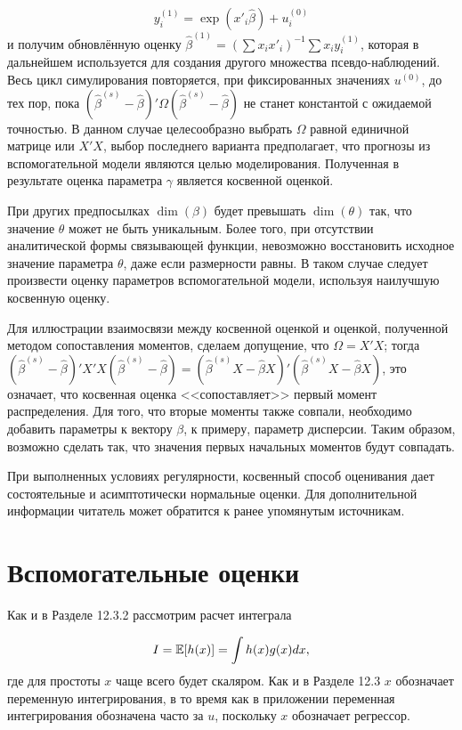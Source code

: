 \[
y^{(1)}_i=\exp(x'_{i}\hat{\beta})+u^{(0)}_i
\]
и получим обновлённую оценку $\hat{\beta}^{(1)}=(\sum{x_{i}x'_{i}})^{-1}\sum{x_{i}y^{(1)}_i}$, которая в дальнейшем используется для создания другого множества псевдо-наблюдений. Весь цикл симулирования повторяется, при фиксированных значениях $u^{(0)}$, до тех пор, пока $(\hat{\beta}^{(s)}-\hat{\beta})'\Omega(\hat{\beta}^{(s)}-\hat{\beta})$ не станет константой с ожидаемой точностью. В данном случае целесообразно выбрать $\Omega$ равной единичной матрице или $X'X$, выбор последнего варианта предполагает, что прогнозы из вспомогательной модели являются целью моделирования. Полученная в результате оценка параметра $\gamma$ является косвенной оценкой.

При других предпосылках $\dim{(\beta)}$ будет превышать $\dim{(\theta)}$ так, что  значение $\theta$ может не быть уникальным. Более того, при отсутствии аналитической формы связывающей функции, невозможно восстановить исходное значение параметра $\theta$, даже если размерности равны. В таком случае следует произвести оценку параметров вспомогательной модели, используя наилучшую косвенную оценку.

Для иллюстрации взаимосвязи между косвенной оценкой и оценкой, полученной методом сопоставления моментов, сделаем допущение, что $\Omega=X'X$; тогда $(\hat{\beta}^{(s)}-\hat{\beta})'X'X(\hat{\beta}^{(s)}-\hat{\beta})=(\hat{\beta}^{(s)}X-\hat{\beta}X)'(\hat{\beta}^{(s)}X-\hat{\beta}X)$, это означает, что косвенная оценка <<сопоставляет>> первый момент распределения. Для того, что вторые моменты также совпали, необходимо добавить параметры к вектору $\beta$, к примеру, параметр дисперсии. Таким образом, возможно сделать так, что значения первых начальных моментов будут совпадать.

При выполненных условиях регулярности, косвенный способ оценивания дает состоятельные и асимптотически нормальные оценки. Для дополнительной информации читатель может обратится к ранее упомянутым источникам.

\section{Вспомогательные оценки}

Как и в Разделе 12.3.2 рассмотрим расчет интеграла

\begin{equation}
I=\mathbb{E}[h(x)]=\int{h(x)g(x)dx},
\end{equation}
где для простоты $x$ чаще всего будет скаляром. Как и в Разделе 12.3 $x$ обозначает переменную интегрирования, в то время как в приложении переменная интегрирования обозначена часто за $u$, поскольку $x$ обозначает регрессор. 

